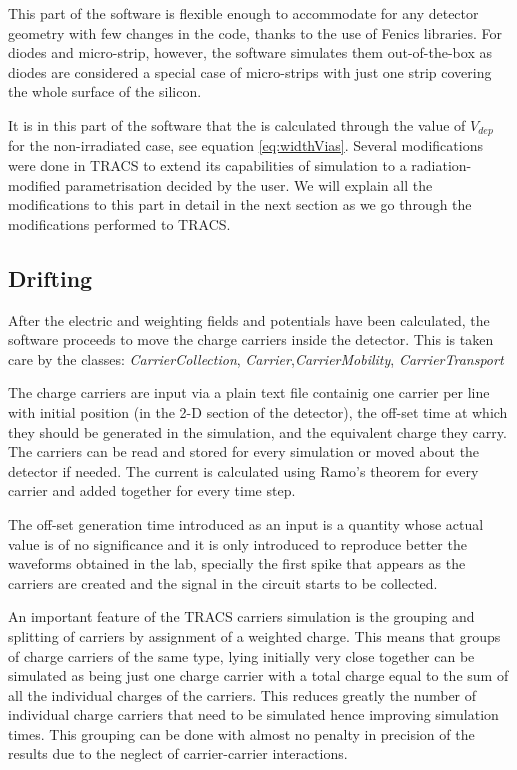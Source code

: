 This part of the software is flexible enough to accommodate for any detector geometry with few changes in the code, thanks to the use of Fenics libraries. For diodes and micro-strip, however, the software simulates them out-of-the-box as diodes are considered a special case of micro-strips with just one strip covering the whole surface of the silicon.

It is in this part of the software that the \neff is calculated through the value of $V_{dep}$ for the non-irradiated case, see equation \ref{eq:widthVias}. Several modifications were done in TRACS to extend its capabilities of simulation to a radiation-modified \neff parametrisation decided by the user. We will explain all the modifications to this part in detail in the next section as we go through the modifications performed to TRACS.


\subsection{Drifting}

After the electric and weighting fields and potentials have been calculated, the software proceeds to move the charge carriers inside the detector. This is taken care by the classes: \textit{CarrierCollection}, \textit{Carrier},\textit{CarrierMobility}, \textit{CarrierTransport}

The charge carriers are input via a plain text file containig one carrier per line with initial position (in the 2-D section of the detector), the off-set time at which they should be generated in the simulation, and the equivalent charge they carry. The carriers can be read and stored for every simulation or moved about the detector if needed. The current is calculated using Ramo's theorem for every carrier and added together for every time step.

The off-set generation time introduced as an input is a quantity whose actual value is of no significance and it is only introduced to reproduce better the waveforms obtained in the lab, specially the first spike that appears as the carriers are created and the signal in the circuit starts to be collected. 

An important feature of the TRACS carriers simulation is the grouping and splitting of carriers by assignment of a weighted charge. This means that groups of charge carriers  of the same type, lying initially very close together can be simulated as being just one charge carrier with a total charge equal to the sum of all the individual charges of the carriers. This reduces greatly the number of individual charge carriers that need to be simulated hence improving simulation times. This grouping can be done with almost no penalty in precision of the results due to the neglect of carrier-carrier interactions.


